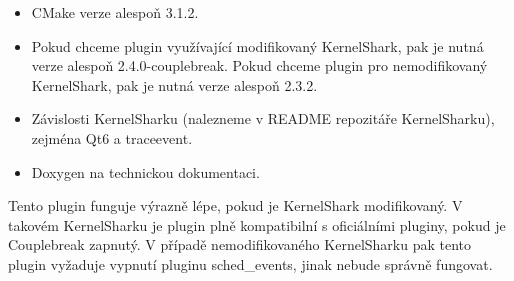 \begin{itemize}
  \item CMake verze alespoň 3.1.2.
  \item Pokud chceme plugin využívající modifikovaný KernelShark, pak je nutná verze alespoň 2.4.0-couplebreak. Pokud chceme plugin pro nemodifikovaný KernelShark, pak je nutná verze alespoň 2.3.2.
  \item Závislosti KernelSharku (nalezneme v README repozitáře KernelSharku), zejména Qt6 a traceevent.
  \item Doxygen na technickou dokumentaci.
\end{itemize}

Tento plugin funguje výrazně lépe, pokud je KernelShark modifikovaný. V takovém KernelSharku je plugin plně kompatibilní s oficiálními pluginy, pokud je Couplebreak zapnutý. V případě nemodifikovaného KernelSharku pak tento plugin vyžaduje vypnutí pluginu sched\_events, jinak nebude správně fungovat.

